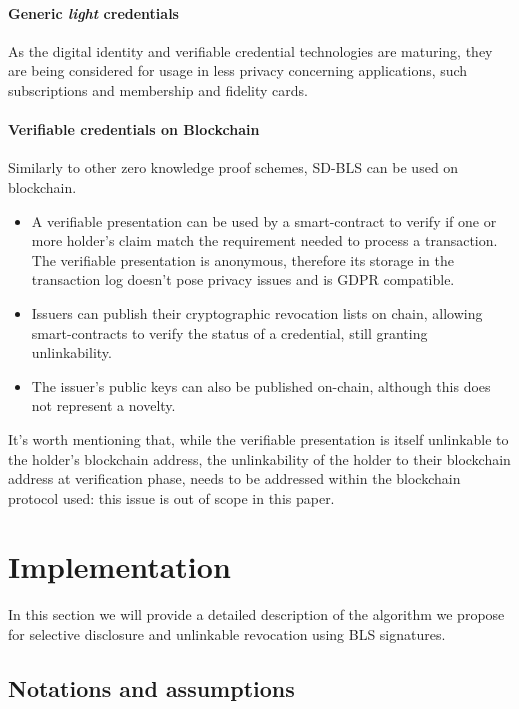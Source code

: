 \documentclass[conference]{IEEEtran}
\begin{document}
\paragraph{Generic \textit{light} credentials}
As the digital identity and verifiable credential technologies are maturing, they are being considered for usage in less privacy concerning applications, such subscriptions and membership and fidelity cards.

\paragraph{Verifiable credentials on Blockchain}
Similarly to other zero knowledge proof schemes, SD-BLS can be used on blockchain.
\begin{itemize}
    \item A verifiable presentation can be used by a smart-contract to verify if one or more holder's claim match the requirement needed to process a transaction. The verifiable presentation is anonymous, therefore its storage in the transaction log doesn't pose privacy issues and is GDPR compatible.
    \item Issuers can publish their cryptographic revocation lists on chain, allowing smart-contracts to verify the status of a credential, still granting unlinkability.
    \item The issuer's public keys can also be published on-chain, although this does not represent a novelty.
\end{itemize}

It's worth mentioning that, while the verifiable presentation is itself unlinkable to the holder's blockchain address, the unlinkability of the holder to their blockchain address at verification phase, needs to be addressed within the blockchain protocol used: this issue is out of scope in this paper.

\section{Implementation}

In this section we will provide a detailed description of the algorithm we propose for selective disclosure and unlinkable revocation using BLS signatures.

\subsection{Notations and assumptions}
\end{document}
